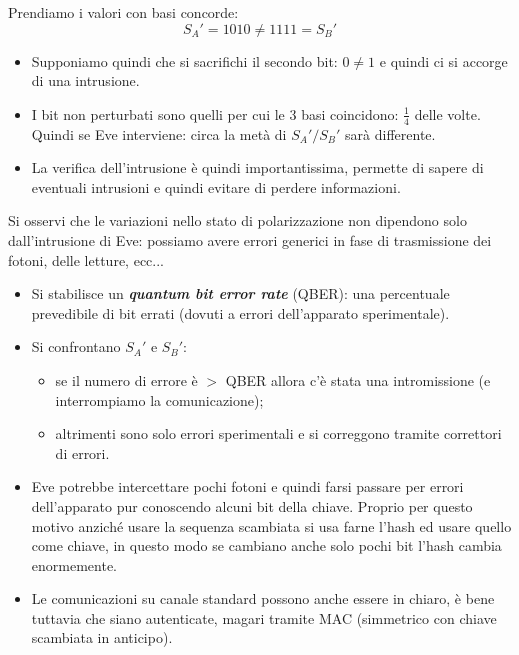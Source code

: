 \noindent Prendiamo i valori con basi concorde:
$$ S_A' = 1010 \neq  1111 =S_B' $$
\begin{itemize}
	\item Supponiamo quindi che si sacrifichi il secondo bit: $0 \neq 1$ e quindi ci si accorge di una intrusione.
	\item I bit non perturbati sono quelli per cui le 3 basi coincidono: $\frac{1}{4}$ delle volte. Quindi se Eve interviene: circa la metà di $S_A'/S_B'$ sarà differente.
	\item La verifica dell'intrusione è quindi importantissima, permette di sapere di eventuali intrusioni e quindi evitare di perdere informazioni.
\end{itemize}
Si osservi che le variazioni nello stato di polarizzazione non dipendono solo dall'intrusione di Eve: possiamo avere errori generici in fase di trasmissione dei fotoni, delle letture, ecc...
\begin{itemize} 
	\item Si stabilisce un \textbf{\emph{quantum bit error rate}} (QBER): una percentuale prevedibile di bit errati (dovuti a errori dell'apparato sperimentale).
	\item Si confrontano $S_A'$ e $S_B'$:
	\begin{itemize}
		\item se il numero di errore è $>$ QBER allora c'è stata una intromissione (e interrompiamo la comunicazione);
		\item altrimenti sono solo errori sperimentali e si correggono tramite correttori di errori.
	\end{itemize}	
	\item Eve potrebbe intercettare pochi fotoni e quindi farsi passare per errori dell'apparato pur conoscendo alcuni bit della chiave. Proprio per questo motivo anziché usare la sequenza scambiata si usa farne l'hash ed usare quello come chiave, in questo modo se cambiano anche solo pochi bit l'hash cambia enormemente.
	
	\item Le comunicazioni su canale standard possono anche essere in chiaro, è bene tuttavia che siano autenticate, magari tramite MAC (simmetrico con chiave scambiata in anticipo).
\end{itemize}
